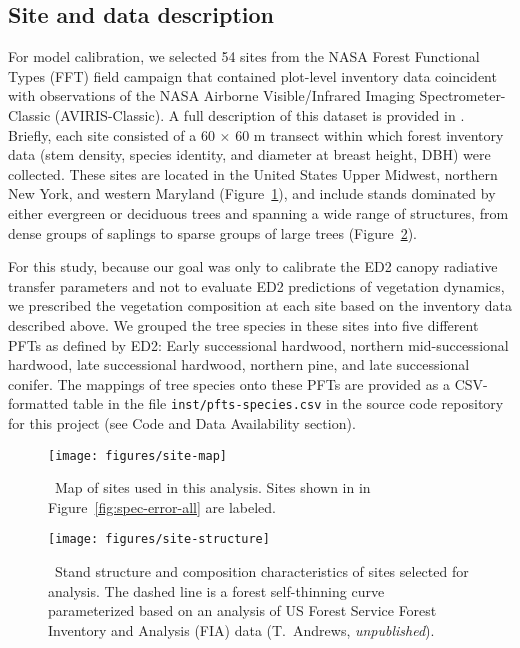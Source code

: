 \subsection{Site and data description}\label{subsec:site-data}

For model calibration, we selected 54 sites from the NASA Forest Functional Types (FFT) field campaign that contained plot-level inventory data coincident with observations of the NASA Airborne Visible/Infrared Imaging Spectrometer-Classic (AVIRIS-Classic).
A full description of this dataset is provided in \citet{singh2015imaging}.
Briefly, each site consisted of a 60 $\times$ 60 m transect within which forest inventory data (stem density, species identity, and diameter at breast height, DBH) were collected.
These sites are located in the United States Upper Midwest, northern New York, and western Maryland (Figure~\ref{fig:site-map}),
and include stands dominated by either evergreen or deciduous trees and spanning a wide range of structures, from dense groups of saplings to sparse groups of large trees (Figure~\ref{fig:site-structure}).

For this study, because our goal was only to calibrate the ED2 canopy radiative transfer parameters and not to evaluate ED2 predictions of vegetation dynamics, we prescribed the vegetation composition at each site based on the inventory data described above.
We grouped the tree species in these sites into five different PFTs as defined by ED2:
Early successional hardwood, northern mid-successional hardwood, late successional hardwood, northern pine, and late successional conifer.
The mappings of tree species onto these PFTs are provided as a CSV-formatted table in the file \texttt{inst/pfts-species.csv} in the source code repository for this project (see Code and Data Availability section).

\begin{figure}
  \centering
  \texttt{[image: figures/site-map]}
  \caption{\
    Map of sites used in this analysis.
    Sites shown in in Figure~\ref{fig:spec-error-all} are labeled.
  }\label{fig:site-map}
\end{figure}

\begin{figure}
  \centering
  \texttt{[image: figures/site-structure]}
  \caption{\
    Stand structure and composition characteristics of sites selected for analysis.
    The dashed line is a forest self-thinning curve \citep[c.f.,][]{zeide2010comparison} parameterized based on an analysis of US Forest Service Forest Inventory and Analysis (FIA) data (T.\ Andrews, \emph{unpublished}).
  }\label{fig:site-structure}
\end{figure}

